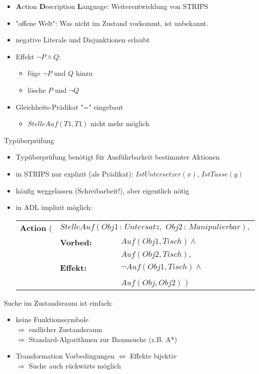 \begin{itemize}
\item \textbf{A}ction \textbf{D}escription \textbf{L}anguage: Weiterentwicklung von STRIPS
\item "{}offene Welt"{}: Was nicht im Zustand vorkommt, ist unbekannt.
\item negative Literale und Disjunktionen erlaubt
\item Effekt $\neg P \wedge Q$:
\begin{itemize}
\item füge $\neg P$ und $Q$ hinzu
\item lösche $P$ und $\neg Q$
\end{itemize}
\item Gleichheits-Prädikat "{}="{} eingebaut
\begin{itemize}
\item $StelleAuf(T1,T1)$ nicht mehr möglich
\end{itemize}
\end{itemize}
Typüberprüfung
\begin{itemize}
\item Typüberprüfung benötigt für Ausführbarkeit bestimmter Aktionen
\item in STRIPS nur explizit (als Prädikat): $IstUntersetzer(x)$, $IstTasse(y)$
\item häufig weggelassen (Schreibarbeit!), aber eigentlich nötig
\item in ADL implizit möglich:
\begin{center}
\begin{tabular}{lll}
\textbf{Action} ( & \multicolumn{2}{l}{$StelleAuf(Obj1 \, : \, Untersatz, \,\, Obj2 \, : \, Manipulierbar),$} \\
& \textbf{Vorbed:} & $Auf(Obj1, Tisch) \wedge$ \\ && $Auf(Obj2, Tisch),$ \\
& \textbf{Effekt:} & $\neg Auf(Obj1, Tisch) \wedge$ \\ && $Auf(Obj, Obj2)$ \qquad \quad )
\end{tabular}
\end{center}
\end{itemize}
Suche im Zustandsraum ist einfach:
\begin{itemize}
\item keine Funktionssymbole \\ $\Rightarrow$ endlicher Zustandsraum \\ $\Rightarrow$ Standard-Algorithmen zur Baumsuche (z.B. A*)
\item Transformation Vorbedingungen $\Leftrightarrow$ Effekte bijektiv \\ $\Rightarrow$ Suche auch rückwärts möglich
\end{itemize}

